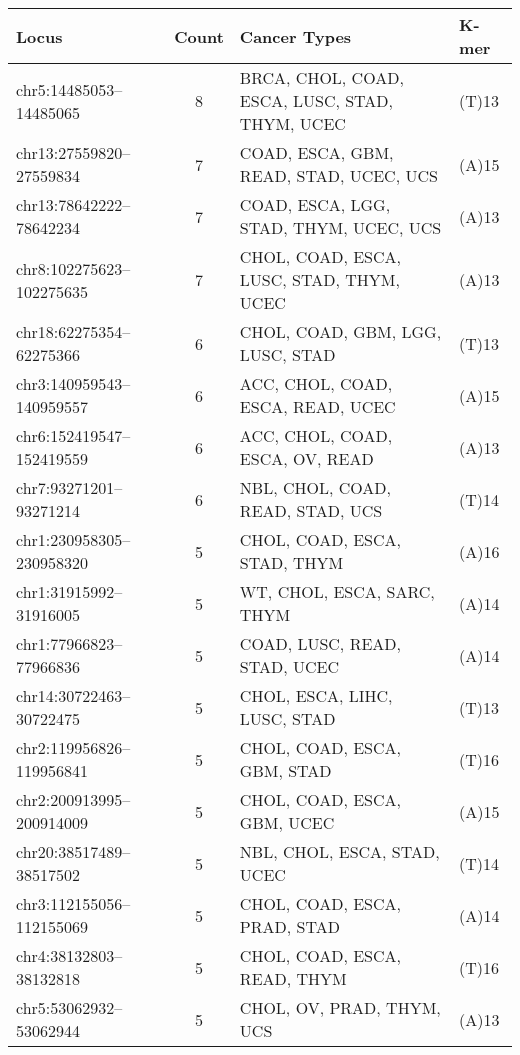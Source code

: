 \begin{landscape}
    \begin{table}[htp]
    	\centering
    	\begin{tabular}{lcll}
    		\textbf{Locus} & \textbf{Count} & \textbf{Cancer Types} & \textbf{K-mer} \\
    		\hline
    		chr5:14485053--14485065 & 8     & BRCA, CHOL, COAD, ESCA, LUSC, STAD, THYM, UCEC & (T)13 \\
    		chr13:27559820--27559834 & 7     & COAD, ESCA, GBM, READ, STAD, UCEC, UCS & (A)15 \\
    		chr13:78642222--78642234 & 7     & COAD, ESCA, LGG, STAD, THYM, UCEC, UCS & (A)13 \\
    		chr8:102275623--102275635 & 7     & CHOL, COAD, ESCA, LUSC, STAD, THYM, UCEC & (A)13 \\
    		chr18:62275354--62275366 & 6     & CHOL, COAD, GBM, LGG, LUSC, STAD & (T)13 \\
    		chr3:140959543--140959557 & 6     & ACC, CHOL, COAD, ESCA, READ, UCEC & (A)15 \\
    		chr6:152419547--152419559 & 6     & ACC, CHOL, COAD, ESCA, OV, READ & (A)13 \\
    		chr7:93271201--93271214 & 6     & NBL, CHOL, COAD, READ, STAD, UCS & (T)14 \\
    		chr1:230958305--230958320 & 5     & CHOL, COAD, ESCA, STAD, THYM & (A)16 \\
    		chr1:31915992--31916005 & 5     & WT, CHOL, ESCA, SARC, THYM & (A)14 \\
    		chr1:77966823--77966836 & 5     & COAD, LUSC, READ, STAD, UCEC & (A)14 \\
    		chr14:30722463--30722475 & 5     & CHOL, ESCA, LIHC, LUSC, STAD & (T)13 \\
    		chr2:119956826--119956841 & 5     & CHOL, COAD, ESCA, GBM, STAD & (T)16 \\
    		chr2:200913995--200914009 & 5     & CHOL, COAD, ESCA, GBM, UCEC & (A)15 \\
    		chr20:38517489--38517502 & 5     & NBL, CHOL, ESCA, STAD, UCEC & (T)14 \\
    		chr3:112155056--112155069 & 5     & CHOL, COAD, ESCA, PRAD, STAD & (A)14 \\
    		chr4:38132803--38132818 & 5     & CHOL, COAD, ESCA, READ, THYM & (T)16 \\
    		chr5:53062932--53062944 & 5     & CHOL, OV, PRAD, THYM, UCS & (A)13 \\

\end{tabular}
\end{table}
\end{landscape}
